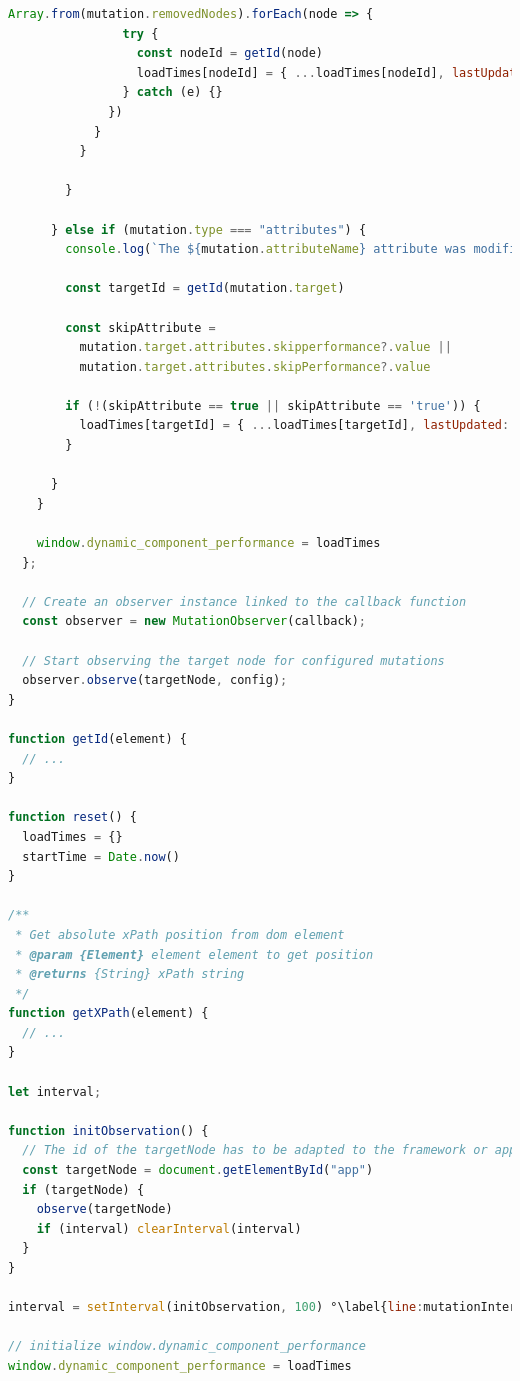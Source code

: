 \documentclass[a4paper, 12pt]{article}
\begin{document}
\begin{lstlisting}[caption={Injected mutation recorder script}, label={lst:performance-recorder}, language=JavaScript, escapechar=°]
              Array.from(mutation.removedNodes).forEach(node => {
                try {
                  const nodeId = getId(node)
                  loadTimes[nodeId] = { ...loadTimes[nodeId], lastUpdated: Date.now() - startTime, xpath: loadTimes[nodeId]?.xpath || getXPath(node) }
                } catch (e) {}
              })
            }
          }

        }

      } else if (mutation.type === "attributes") {
        console.log(`The ${mutation.attributeName} attribute was modified.`, mutation);

        const targetId = getId(mutation.target)

        const skipAttribute =
          mutation.target.attributes.skipperformance?.value ||
          mutation.target.attributes.skipPerformance?.value

        if (!(skipAttribute == true || skipAttribute == 'true')) {
          loadTimes[targetId] = { ...loadTimes[targetId], lastUpdated: Date.now() - startTime, xpath: loadTimes[targetId]?.xpath || getXPath(mutation.target) }
        }

      }
    }

    window.dynamic_component_performance = loadTimes
  };

  // Create an observer instance linked to the callback function
  const observer = new MutationObserver(callback);

  // Start observing the target node for configured mutations
  observer.observe(targetNode, config);
}

function getId(element) {
  // ...
}

function reset() {
  loadTimes = {}
  startTime = Date.now()
}

/**
 * Get absolute xPath position from dom element
 * @param {Element} element element to get position
 * @returns {String} xPath string
 */
function getXPath(element) {
  // ...
}

let interval;

function initObservation() {
  // The id of the targetNode has to be adapted to the framework or application
  const targetNode = document.getElementById("app")
  if (targetNode) {
    observe(targetNode)
    if (interval) clearInterval(interval)
  }
}

interval = setInterval(initObservation, 100) °\label{line:mutationInterval}°

// initialize window.dynamic_component_performance
window.dynamic_component_performance = loadTimes
\end{lstlisting}
\vspace{1cm}
\end{document}
